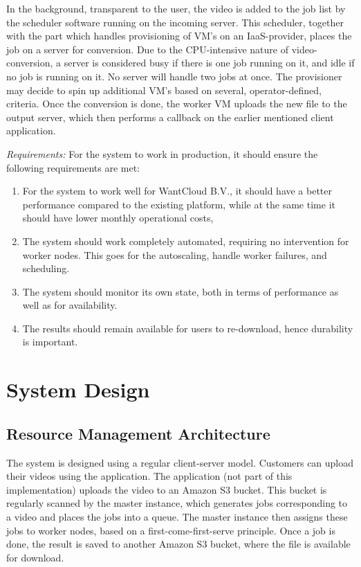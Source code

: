 \documentclass[a4paper]{IEEEtran}
\begin{document}
In the background, transparent to the user, the video is added to the job list by the scheduler software running on the incoming server.
This scheduler, together with the part which handles provisioning of VM's on an IaaS-provider, places the job on a server for conversion.
Due to the CPU-intensive nature of video-conversion, a server is considered busy if there is one job running on it, and idle if no job is running on it. 
No server will handle two jobs at once.
The provisioner may decide to spin up additional VM's based on several, operator-defined, criteria.
Once the conversion is done, the worker VM uploads the new file to the output server, which then performs a callback on the earlier mentioned client application.

\textit{Requirements:} For the system to work in production, it should ensure the following requirements are met:

\begin{enumerate}
\item For the system to work well for WantCloud B.V., it should have a better performance compared to the existing platform, while at the same time it should have lower monthly operational costs,
\item The system should work completely automated, requiring no intervention for worker nodes. This goes for the autoscaling, handle worker failures, and scheduling.
\item The system should monitor its own state, both in terms of performance as well as for availability.
\item The results should remain available for users to re-download, hence durability is important.
\end{enumerate}


\section{System Design}

\subsection{Resource Management Architecture}

The system is designed using a regular client-server model.
Customers can upload their videos using the application.
The application (not part of this implementation) uploads the video to an Amazon S3 bucket.
This bucket is regularly scanned by the master instance, which generates jobs corresponding to a video and places the jobs into a queue.
The master instance then assigns these jobs to worker nodes, based on a first-come-first-serve principle.
Once a job is done, the result is saved to another Amazon S3 bucket, where the file is available for download.
\end{document}
